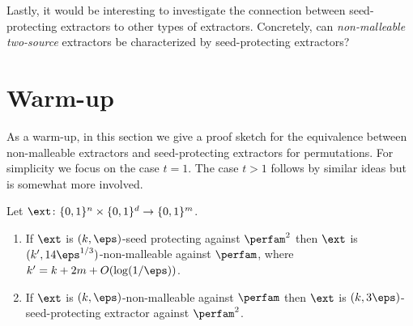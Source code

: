 \documentclass{toc}
\begin{document}
Lastly, it would be interesting to investigate the connection between seed-protecting extractors to other types of extractors. Concretely, can \emph{non-malleable two-source} extractors be characterized by seed-protecting extractors?

%



\section{Warm-up}\label{sec:overview}

As a warm-up, in this section we give a proof sketch for the equivalence between non-malleable extractors and seed-protecting extractors for permutations. For simplicity we focus on the case $t = 1$. The case $t > 1$ follows by similar ideas but is somewhat more involved. 

\begin{theorem}\label{thm:warmup}
Let $\ext \colon \{0,1\}^n \times \{0,1\}^d \to \{0,1\}^m$.%
\begin{enumerate}
	\item If $\ext$ is $(k,\eps)$-seed protecting against $\perfam^2$ then $\ext$ is $(k',14\eps^{1/3})$-non-malleable against $\perfam$, where $k' = k+2m+O(\log(1/\eps))$.
	\item If $\ext$ is $(k,\eps)$-non-malleable against $\perfam$ then $\ext$ is $(k,3\eps)$-seed-protecting extractor against $\perfam^2$.
\end{enumerate}
\end{theorem}
\end{document}
